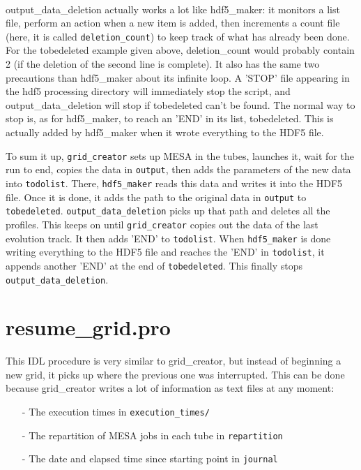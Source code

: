 \documentclass{report}
\begin{document}
\paragraph{} output\_data\_deletion actually works a lot like hdf5\_maker: it monitors a list file, perform an action when a new item is added, then increments a count file (here, it is called \verb+deletion_count+) to keep track of what has already been done. For the tobedeleted example given above, deletion\_count would probably contain 2 (if the deletion of the second line is complete). It also has the same two precautions than hdf5\_maker about its infinite loop. A 'STOP' file appearing in the hdf5 processing directory will immediately stop the script, and output\_data\_deletion will stop if tobedeleted can't be found. The normal way to stop is, as for hdf5\_maker, to reach an 'END' in its list, tobedeleted. This is actually added by hdf5\_maker when it wrote everything to the HDF5 file.

To sum it up, \verb+grid_creator+ sets up MESA in the tubes, launches it, wait for the run to end, copies the data in \verb+output+, then adds the parameters of the new data into \verb+todolist+. There, \verb+hdf5_maker+ reads this data and writes it into the HDF5 file. Once it is done, it adds the path to the original data in \verb+output+ to \verb+tobedeleted+. \verb+output_data_deletion+ picks up that path and deletes all the profiles. This keeps on until \verb+grid_creator+ copies out the data of the last evolution track. It then adds 'END' to \verb+todolist+. When \verb+hdf5_maker+ is done writing everything to the HDF5 file and reaches the 'END' in \verb+todolist+, it appends another 'END' at the end of \verb+tobedeleted+. This finally stops \verb+output_data_deletion+.

\section{resume\_grid.pro}

This IDL procedure is very similar to grid\_creator, but instead of beginning a new grid, it picks up where the previous one was interrupted. This can be done because grid\_creator writes a lot of information as text files at any moment:
\begin{itemize}
\item[-] The execution times in \verb+execution_times/+
\item[-] The repartition of MESA jobs in each tube in \verb+repartition+
\item[-] The date and elapsed time since starting point in \verb+journal+
\end{itemize}
\end{document}
